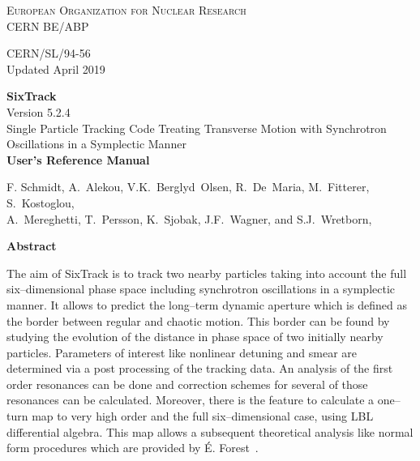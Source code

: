 \begin{titlepage}
\begin{center}\normalsize\scshape
    European Organization for Nuclear Research \\
    CERN BE/ABP
\end{center}
\vspace*{2mm}
\begin{flushright}
    CERN/SL/94-56 \\
    Updated April 2019
\end{flushright}
\begin{center}\Huge
    \textbf{SixTrack} \\
    \LARGE Version 5.2.4 \\
    \vspace*{8mm}Single Particle Tracking Code Treating Transverse Motion with Synchrotron Oscillations in a Symplectic Manner \\
    \vspace*{8mm}\textbf{User's Reference Manual}
\end{center}
\begin{center}
    F. Schmidt,
    A.~Alekou,
    V.K.~Berglyd~Olsen,
    R.~De~Maria,
    M.~Fitterer,
    S.~Kostoglou,\\
    A.~Mereghetti,
    T.~Persson,
    K.~Sjobak,
    J.F.~Wagner,
    and
    S.J.~Wretborn,
\end{center}
\begin{center}\large
    \vspace*{10mm}\textbf{Abstract} \\
\end{center}
The aim of SixTrack is to track two nearby particles taking into account the full six--dimensional phase space including synchrotron oscillations in a symplectic manner.
It allows to predict the long--term dynamic aperture which is defined as the border between regular and chaotic motion.
This border can be found by studying the evolution of the distance in phase space of two initially nearby particles.
Parameters of interest like nonlinear detuning and smear are determined via a post processing of the tracking data.
An analysis of the first order resonances can be done and correction schemes for several of those resonances can be calculated.
Moreover, there is the feature to calculate a one--turn map to very high order and the full six--dimensional case, using LBL differential algebra.
This map allows a subsequent theoretical analysis like normal form procedures which are provided by \'{E}. Forest~\cite{DALIE}.


\end{titlepage}
